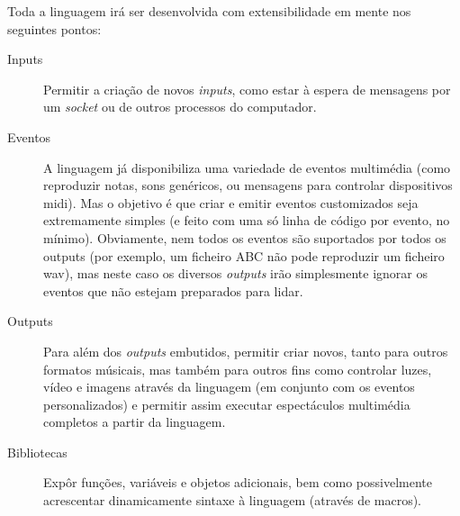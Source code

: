 Toda a linguagem irá ser desenvolvida com extensibilidade em mente nos seguintes pontos:
\begin{description}
    \item[Inputs] Permitir a criação de novos \textit{inputs}, como estar à espera de mensagens por um \textit{socket} ou de outros processos do computador.
    \item[Eventos] A linguagem já disponibiliza uma variedade de eventos multimédia (como reproduzir notas, sons genéricos, ou mensagens para controlar dispositivos \acrshort{midi}). Mas o objetivo é que criar e emitir eventos customizados seja extremamente simples (e feito com uma só linha de código por evento, no mínimo). Obviamente, nem todos os eventos são suportados por todos os outputs (por exemplo, um ficheiro ABC não pode reproduzir um ficheiro \acrshort{wav}), mas neste caso os diversos \textit{outputs} irão simplesmente ignorar os eventos que não estejam preparados para lidar.
    \item[Outputs] Para além dos \textit{outputs} embutidos, permitir criar novos, tanto para outros formatos músicais, mas também para outros fins como controlar luzes, vídeo e imagens através da linguagem (em conjunto com os eventos personalizados) e permitir assim executar espectáculos multimédia completos a partir da linguagem.
    \item[Bibliotecas] Expôr funções, variáveis e objetos adicionais, bem como possivelmente acrescentar dinamicamente sintaxe à linguagem (através de macros).
\end{description}


